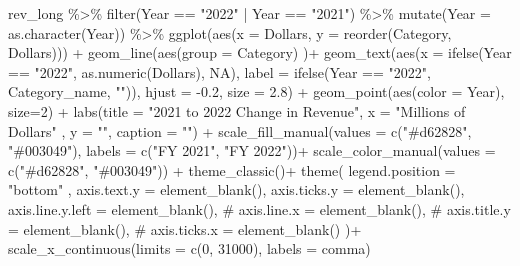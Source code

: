 \documentclass[
  letterpaper,
  DIV=11,
  numbers=noendperiod]{scrreport}
\newenvironment{Shaded}{\begin{snugshade}}{\end{snugshade}}
\newcommand{\AttributeTok}[1]{\textcolor[rgb]{0.40,0.45,0.13}{#1}}
\newcommand{\CommentTok}[1]{\textcolor[rgb]{0.37,0.37,0.37}{#1}}
\newcommand{\ConstantTok}[1]{\textcolor[rgb]{0.56,0.35,0.01}{#1}}
\newcommand{\DecValTok}[1]{\textcolor[rgb]{0.68,0.00,0.00}{#1}}
\newcommand{\FloatTok}[1]{\textcolor[rgb]{0.68,0.00,0.00}{#1}}
\newcommand{\FunctionTok}[1]{\textcolor[rgb]{0.28,0.35,0.67}{#1}}
\newcommand{\NormalTok}[1]{\textcolor[rgb]{0.00,0.23,0.31}{#1}}
\newcommand{\SpecialCharTok}[1]{\textcolor[rgb]{0.37,0.37,0.37}{#1}}
\newcommand{\StringTok}[1]{\textcolor[rgb]{0.13,0.47,0.30}{#1}}
\begin{document}
\begin{Shaded}
\begin{Highlighting}[]
\NormalTok{rev\_long }\SpecialCharTok{\%\textgreater{}\%}
    \FunctionTok{filter}\NormalTok{(Year }\SpecialCharTok{==} \StringTok{"2022"} \SpecialCharTok{|}\NormalTok{ Year }\SpecialCharTok{==} \StringTok{"2021"}\NormalTok{) }\SpecialCharTok{\%\textgreater{}\%}
  \FunctionTok{mutate}\NormalTok{(}\AttributeTok{Year =} \FunctionTok{as.character}\NormalTok{(Year)) }\SpecialCharTok{\%\textgreater{}\%}
  \FunctionTok{ggplot}\NormalTok{(}\FunctionTok{aes}\NormalTok{(}\AttributeTok{x =}\NormalTok{ Dollars, }\AttributeTok{y =} \FunctionTok{reorder}\NormalTok{(Category, Dollars))) }\SpecialCharTok{+}
  \FunctionTok{geom\_line}\NormalTok{(}\FunctionTok{aes}\NormalTok{(}\AttributeTok{group =}\NormalTok{ Category) )}\SpecialCharTok{+}
    \FunctionTok{geom\_text}\NormalTok{(}\FunctionTok{aes}\NormalTok{(}\AttributeTok{x =} \FunctionTok{ifelse}\NormalTok{(Year }\SpecialCharTok{==} \StringTok{"2022"}\NormalTok{, }\FunctionTok{as.numeric}\NormalTok{(Dollars), }\ConstantTok{NA}\NormalTok{),  }\AttributeTok{label =} \FunctionTok{ifelse}\NormalTok{(Year }\SpecialCharTok{==} \StringTok{"2022"}\NormalTok{, Category\_name, }\StringTok{""}\NormalTok{)),  }
            \AttributeTok{hjust =} \SpecialCharTok{{-}}\FloatTok{0.2}\NormalTok{,}
            \AttributeTok{size =} \FloatTok{2.8}\NormalTok{) }\SpecialCharTok{+}
         \FunctionTok{geom\_point}\NormalTok{(}\FunctionTok{aes}\NormalTok{(}\AttributeTok{color =}\NormalTok{ Year), }\AttributeTok{size=}\DecValTok{2}\NormalTok{)  }\SpecialCharTok{+}
  \FunctionTok{labs}\NormalTok{(}\AttributeTok{title =} \StringTok{"2021 to 2022 Change in Revenue"}\NormalTok{, }\AttributeTok{x =} \StringTok{"Millions of Dollars"}\NormalTok{ , }\AttributeTok{y =} \StringTok{""}\NormalTok{,  }\AttributeTok{caption =} \StringTok{""}\NormalTok{)  }\SpecialCharTok{+}
   \FunctionTok{scale\_fill\_manual}\NormalTok{(}\AttributeTok{values =} \FunctionTok{c}\NormalTok{(}\StringTok{"\#d62828"}\NormalTok{, }\StringTok{"\#003049"}\NormalTok{), }\AttributeTok{labels =} \FunctionTok{c}\NormalTok{(}\StringTok{"FY 2021"}\NormalTok{, }\StringTok{"FY 2022"}\NormalTok{))}\SpecialCharTok{+}
    \FunctionTok{scale\_color\_manual}\NormalTok{(}\AttributeTok{values =} \FunctionTok{c}\NormalTok{(}\StringTok{"\#d62828"}\NormalTok{, }\StringTok{"\#003049"}\NormalTok{)) }\SpecialCharTok{+}   
  \FunctionTok{theme\_classic}\NormalTok{()}\SpecialCharTok{+} 
    \FunctionTok{theme}\NormalTok{(}
   \AttributeTok{legend.position =} \StringTok{"bottom"}\NormalTok{ ,}
  \AttributeTok{axis.text.y =} \FunctionTok{element\_blank}\NormalTok{(),}
  \AttributeTok{axis.ticks.y =} \FunctionTok{element\_blank}\NormalTok{(),}
  \AttributeTok{axis.line.y.left  =} \FunctionTok{element\_blank}\NormalTok{(),}
 \CommentTok{\# axis.line.x = element\_blank(),}
  \CommentTok{\#  axis.title.y = element\_blank(),}
 \CommentTok{\# axis.ticks.x = element\_blank()}
\NormalTok{ )}\SpecialCharTok{+}
  \FunctionTok{scale\_x\_continuous}\NormalTok{(}\AttributeTok{limits =} \FunctionTok{c}\NormalTok{(}\DecValTok{0}\NormalTok{, }\DecValTok{31000}\NormalTok{), }\AttributeTok{labels =}\NormalTok{ comma)}
\end{Highlighting}
\end{Shaded}
\end{document}
